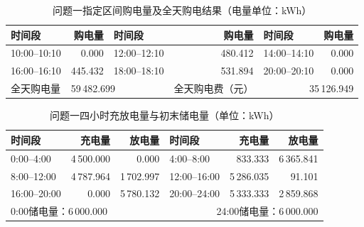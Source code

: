 \begin{table}[H]
\centering
\small
\caption{问题一指定区间购电量及全天购电结果（电量单位：kWh）}
\label{tab:q1-purchase}
\begin{tabular}{lrlrlr}
\toprule
时间段 & 购电量 & 时间段 & 购电量 & 时间段 & 购电量 \\
\midrule
10:00--10:10 & 0.000 & 12:00--12:10 & 480.412 & 14:00--14:10 & 0.000 \\
16:00--16:10 & 445.432 & 18:00--18:10 & 531.894 & 20:00--20:10 & 0.000 \\
\midrule
全天购电量 & \multicolumn{2}{l}{59\,482.699} & 全天购电费（元） & \multicolumn{2}{r}{35\,126.949} \\
\bottomrule
\end{tabular}
\end{table}
\begin{table}[H]
\centering
\small
\caption{问题一四小时充放电量与初末储电量（单位：kWh）}
\label{tab:q1-battery}
\begin{tabular}{lrrlrr}
\toprule
时间段 & 充电量 & 放电量 & 时间段 & 充电量 & 放电量 \\
\midrule
0:00--4:00 & 4\,500.000 & 0.000 & 4:00--8:00 & 833.333 & 6\,365.841 \\
8:00--12:00 & 4\,787.964 & 1\,702.997 & 12:00--16:00 & 5\,286.035 & 91.101 \\
16:00--20:00 & 0.000 & 5\,780.132 & 20:00--24:00 & 5\,333.333 & 2\,859.868 \\
\midrule
\multicolumn{3}{l}{0:00储电量：6\,000.000} & \multicolumn{3}{r}{24:00储电量：6\,000.000} \\
\bottomrule
\end{tabular}
\end{table}
